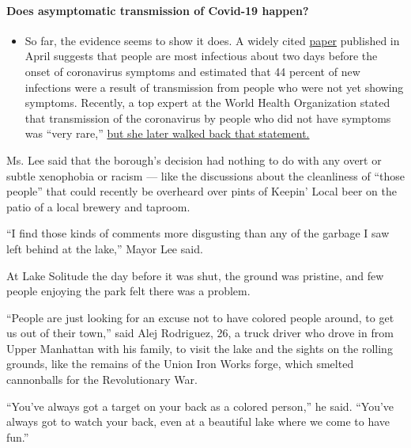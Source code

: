 \begin{itemize}
{  \paragraph{Does asymptomatic transmission of Covid-19
  happen?}\label{does-asymptomatic-transmission-of-covid-19-happen}}

  \begin{itemize}
  \tightlist
  \item
    So far, the evidence seems to show it does. A widely cited
    \href{https://www.nature.com/articles/s41591-020-0869-5}{paper}
    published in April suggests that people are most infectious about
    two days before the onset of coronavirus symptoms and estimated that
    44 percent of new infections were a result of transmission from
    people who were not yet showing symptoms. Recently, a top expert at
    the World Health Organization stated that transmission of the
    coronavirus by people who did not have symptoms was ``very rare,''
    \href{https://www.nytimes.com/2020/06/09/world/coronavirus-updates.html?action=click\&pgtype=Article\&state=default\&region=MAIN_CONTENT_3\&context=storylines_faq\#link-1f302e21}{but
    she later walked back that statement.}
  \end{itemize}
\end{itemize}

Ms. Lee said that the borough's decision had nothing to do with any
overt or subtle xenophobia or racism --- like the discussions about the
cleanliness of ``those people'' that could recently be overheard over
pints of Keepin' Local beer on the patio of a local brewery and taproom.

``I find those kinds of comments more disgusting than any of the garbage
I saw left behind at the lake,'' Mayor Lee said.

At Lake Solitude the day before it was shut, the ground was pristine,
and few people enjoying the park felt there was a problem.

``People are just looking for an excuse not to have colored people
around, to get us out of their town,'' said Alej Rodriguez, 26, a truck
driver who drove in from Upper Manhattan with his family, to visit the
lake and the sights on the rolling grounds, like the remains of the
Union Iron Works forge, which smelted cannonballs for the Revolutionary
War.

``You've always got a target on your back as a colored person,'' he
said. ``You've always got to watch your back, even at a beautiful lake
where we come to have fun.''

